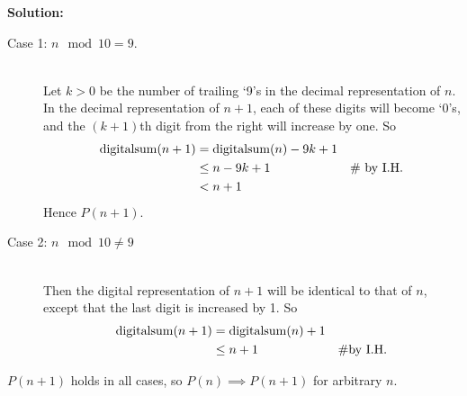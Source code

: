 \documentclass[boldsans]{article}
\newenvironment{solution}
{\bigskip \noindent \textbf{Solution: \\}}
{}
\begin{document}
\begin{enumerate}
\begin{solution}
\begin{description}
\item[Case 1: $n \mod 10 = 9$.]
\ \\
Let $k > 0$ be the number of trailing `9's in the decimal representation of $n$. In the decimal representation of $n+1$, each of these digits will become `0's, and the $(k+1)$th digit from the right will increase by one. So
\begin{align*}
{\mathrm{digitalsum}}(n+1) & = {\mathrm{digitalsum}}(n) - 9k + 1\\
& \leq n - 9k + 1 & \text{\# by I.H.}\\
& < n + 1\\
\end{align*}
Hence $P(n+1)$.
\item[Case 2: $n \mod 10 \neq 9$]
\ \\
Then the digital representation of $n+1$ will be identical to that of $n$, except that the last digit is increased by 1. So
\begin{align*}
{\mathrm{digitalsum}}(n+1) & = {\mathrm{digitalsum}}(n) + 1\\
& \leq n + 1 & \text{\#by I.H.}
\end{align*}
\end{description}
$P(n+1)$ holds in all cases, so $P(n) \implies P(n+1)$ for arbitrary $n$.
\end{solution}

\end{enumerate}
\end{document}
